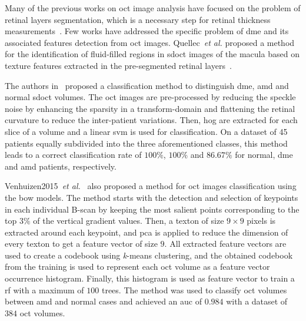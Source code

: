 Many of the previous works on \ac{oct} image analysis have focused on the problem of retinal layers segmentation, which is a necessary step for retinal thickness measurements~\cite{Chiu2010,Kafieh2013}.
Few works have addressed the specific problem of \ac{dme} and its associated features detection from \ac{oct} images. 
Quellec~\textit{et al.} proposed a method for the identification of fluid-filled regions in \ac{sdoct} images of the macula based on texture features extracted in the pre-segmented retinal layers~\cite{Quellec2010}.

The authors in~\cite{Srinivasan2014} proposed a classification method to distinguish \ac{dme}, \ac{amd} and normal \ac{sdoct} volumes.
The \ac{oct} images are pre-processed by reducing the speckle noise by enhancing the sparsity in a transform-domain and flattening the retinal curvature to reduce the inter-patient variations.
Then, \ac{hog} are extracted for each slice of a volume and a linear \ac{svm} is used for classification. 
On a dataset of 45 patients equally subdivided into the three aforementioned classes, this method leads to a correct classification rate of $100 \%$, $100 \%$ and $86.67 \%$ for normal, \ac{dme} and \ac{amd} patients, respectively.

Venhuizen2015~\textit{et al.}~\cite{Venhuizen2015} also proposed a method for \ac{oct} images classification using the \ac{bow} models.
The method starts with the detection and selection of keypoints in each individual B-scan by keeping the most salient points corresponding to the top $3 \%$ of the vertical gradient values. Then, a texton of size $9 \times 9$ pixels is extracted around each keypoint, and \ac{pca} is applied to reduce the dimension of every texton to get a feature vector of size $9$. 
All extracted feature vectors are used to create a codebook using \textit{k}-means clustering, and the obtained codebook from the training is used to represent each \ac{oct} volume as a feature vector occurrence histogram. 
Finally, this histogram is used as feature vector to train a \ac{rf} with a maximum of $100$ trees.
The method was used to classify \ac{oct} volumes between \ac{amd} and normal cases and achieved an \ac{auc} of $0.984$ with a dataset of $384$ \ac{oct} volumes. 

